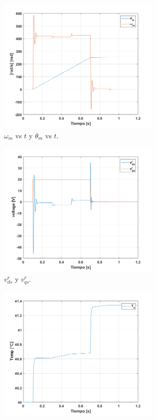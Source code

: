 \documentclass[10pt]{article}
\begin{document}
\begin{itemize}
	\begin{figure}[h!]
	\centering
	\includegraphics[width=0.7\textwidth]{theta_m.png}
	\caption{\label{fig:theta_m} $\omega_{m}$ vs $t$ y $\theta_{m}$ vs $t$.}
	\end{figure}
	\begin{figure}[h!]
	\centering
	\includegraphics[width=0.7\textwidth]{vd_vq.png}
	\caption{\label{fig:vd_vq} $v^{r}_{ds}$ y $v^{r}_{qs}$.}
	\end{figure}
	\begin{figure}[h!]
	\centering
	\includegraphics[width=0.7\textwidth]{temperatura.png}

\end{figure}
\end{itemize}
\end{document}
